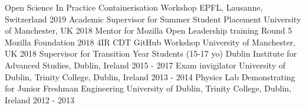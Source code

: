 \begin{cvpress}
   \cvpres
   {Open Science In Practice Containerisation Workshop}
    {EPFL, Lausanne, Switzerland}
    {2019}
   \cvpres
   {Academic Supervisor for Summer Student Placement}
    {University of Manchester, UK}
    {2018}
   \cvpres
   {Mentor for Mozilla Open Leadership training Round 5}
    {Mozilla Foundation}
    {2018}
   \cvpres
   {4IR CDT GitHub Workshop}
    {University of Manchester, UK}
    {2018}
   \cvpres
   {Supervisor for Transition Year Students (15-17 yo)}
   {Dublin Institute for Advanced Studies, Dublin, Ireland}
   {2015 - 2017}
   \cvpres
   {Exam invigilator}
   {University of Dublin, Trinity College, Dublin, Ireland}
   {2013 - 2014}
   \cvpres
   {Physics Lab Demonstrating for Junior Freshman Engineering}
   {University of Dublin, Trinity College, Dublin, Ireland}
   {2012 - 2013}
\end{cvpress}


